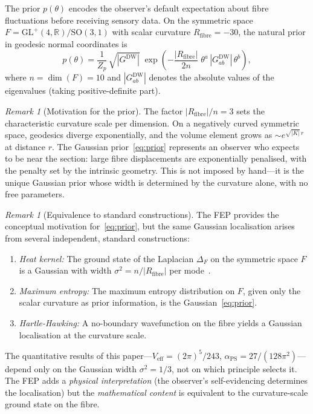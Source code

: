 \documentclass[12pt, a4paper]{article}
\theoremstyle{definition}
\theoremstyle{remark}
\newtheorem{remark}[theorem]{Remark}
\newcommand{\R}{\mathbb{R}}
\newcommand{\SO}{\mathrm{SO}}
\newcommand{\GL}{\mathrm{GL}}
\newcommand{\Veff}{V_{\mathrm{eff}}}
\newcommand{\aPS}{\alpha_{\mathrm{PS}}}
\newcommand{\Rfibre}{R_{\mathrm{fibre}}}
\begin{document}
The prior $p(\theta)$ encodes the observer's default expectation about fibre fluctuations before receiving sensory data.
On the symmetric space $F = \GL^+(4,\R)/\SO(3,1)$ with scalar curvature $\Rfibre = -30$, the natural prior in geodesic normal coordinates is
\begin{equation}
\label{eq:prior}
p(\theta) = \frac{1}{Z_p}\, \sqrt{|G^{\mathrm{DW}}|}\; \exp\!\left(-\frac{|\Rfibre|}{2n}\; \theta^a\, |G^{\mathrm{DW}}_{ab}|\, \theta^b\right),
\end{equation}
where $n = \dim(F) = 10$ and $|G^{\mathrm{DW}}_{ab}|$ denotes the absolute values of the eigenvalues (taking positive-definite part).

\begin{remark}[Motivation for the prior]
The factor $|\Rfibre|/n = 3$ sets the characteristic curvature scale per dimension.
On a negatively curved symmetric space, geodesics diverge exponentially, and the volume element grows as $\sim e^{\sqrt{|K|}\,r}$ at distance $r$.
The Gaussian prior~\eqref{eq:prior} represents an observer who expects to be near the section: large fibre displacements are exponentially penalised, with the penalty set by the intrinsic geometry.
This is not imposed by hand---it is the unique Gaussian prior whose width is determined by the curvature alone, with no free parameters.
\end{remark}

\begin{remark}[Equivalence to standard constructions]
\label{rem:equivalence}
The FEP provides the conceptual motivation for~\eqref{eq:prior}, but the same Gaussian localisation arises from several independent, standard constructions:
\begin{enumerate}[nosep]
\item \emph{Heat kernel:} The ground state of the Laplacian $\Delta_F$ on the symmetric space $F$ is a Gaussian with width $\sigma^2 = n/|\Rfibre|$ per mode~\cite{Giulini2009}.
\item \emph{Maximum entropy:} The maximum entropy distribution on $F$, given only the scalar curvature as prior information, is the Gaussian~\eqref{eq:prior}.
\item \emph{Hartle-Hawking:} A no-boundary wavefunction on the fibre yields a Gaussian localisation at the curvature scale.
\end{enumerate}
The quantitative results of this paper---$\Veff = (2\pi)^5/243$, $\aPS = 27/(128\pi^2)$---depend only on the Gaussian width $\sigma^2 = 1/3$, not on which principle selects it.
The FEP adds a \emph{physical interpretation} (the observer's self-evidencing determines the localisation) but the \emph{mathematical content} is equivalent to the curvature-scale ground state on the fibre.
\end{remark}
\end{document}
